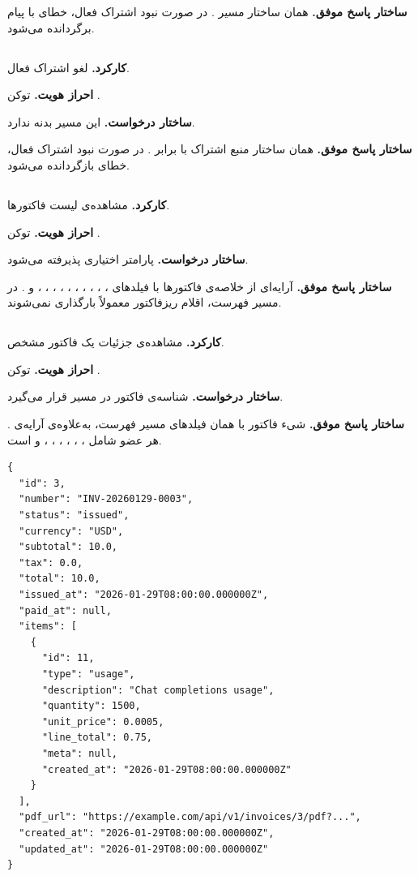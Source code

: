 \textbf{ساختار پاسخ موفق.} همان ساختار مسیر .
در صورت نبود اشتراک فعال، خطای  با پیام
 برگردانده می‌شود.

\subsection{}
\textbf{کارکرد.} لغو اشتراک فعال.

\textbf{احراز هویت.} توکن .

\textbf{ساختار درخواست.} این مسیر بدنه ندارد.

\textbf{ساختار پاسخ موفق.} همان ساختار منبع اشتراک با  برابر
. در صورت نبود اشتراک فعال، خطای  بازگردانده
می‌شود.

\subsection{}
\textbf{کارکرد.} مشاهده‌ی لیست فاکتورها.

\textbf{احراز هویت.} توکن .

\textbf{ساختار درخواست.} پارامتر اختیاری  پذیرفته می‌شود.

\textbf{ساختار پاسخ موفق.} آرایه‌ای از خلاصه‌ی فاکتورها با فیلدهای
، ، ، ، ،
، ، ، ،
،  و . در مسیر فهرست،
اقلام ریزفاکتور معمولاً بارگذاری نمی‌شوند.

\subsection{}
\textbf{کارکرد.} مشاهده‌ی جزئیات یک فاکتور مشخص.

\textbf{احراز هویت.} توکن .

\textbf{ساختار درخواست.} شناسه‌ی فاکتور در مسیر قرار می‌گیرد.

\textbf{ساختار پاسخ موفق.} شیء فاکتور با همان فیلدهای مسیر فهرست، به‌علاوه‌ی
آرایه‌ی . هر عضو  شامل ، ،
، ، ،
،  و  است.

\begin{latin}
\begin{lstlisting}[style=jsonStyle]
{
  "id": 3,
  "number": "INV-20260129-0003",
  "status": "issued",
  "currency": "USD",
  "subtotal": 10.0,
  "tax": 0.0,
  "total": 10.0,
  "issued_at": "2026-01-29T08:00:00.000000Z",
  "paid_at": null,
  "items": [
    {
      "id": 11,
      "type": "usage",
      "description": "Chat completions usage",
      "quantity": 1500,
      "unit_price": 0.0005,
      "line_total": 0.75,
      "meta": null,
      "created_at": "2026-01-29T08:00:00.000000Z"
    }
  ],
  "pdf_url": "https://example.com/api/v1/invoices/3/pdf?...",
  "created_at": "2026-01-29T08:00:00.000000Z",
  "updated_at": "2026-01-29T08:00:00.000000Z"
}
\end{lstlisting}
\end{latin}

